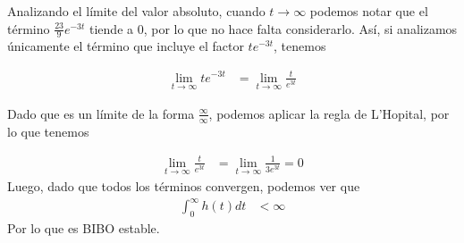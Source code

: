 \documentclass[
  11pt,
  letterpaper,
   addpoints,
  ]{exam}
\begin{document}
\begin{questions}
\begin{solution}
    
    Analizando el límite del valor absoluto, cuando \( t \to \infty \) podemos notar que el término \( \frac{23}{9}e^{-3t} \) tiende a 0, por lo que no hace falta considerarlo. Así, si analizamos únicamente el término que incluye el factor \( te^{-3t} \), tenemos

\begin{align}
\lim_{t \to \infty} te^{-3t} &= \lim_{t \to \infty} \frac{t}{e^{3t}} 
\end{align}

Dado que es un límite de la forma \( \frac{\infty}{\infty} \), podemos aplicar la regla de L'Hopital, por lo que tenemos

\begin{align}
\lim_{t \to \infty} \frac{t}{e^{3t}} &= \lim_{t \to \infty} \frac{1}{3e^{3t}} = 0 
\end{align}
Luego, dado que todos los términos convergen, podemos ver que
\begin{align}
\int_0^\infty h(t) dt &< \infty 
\end{align}
Por lo que es BIBO estable.

\end{solution}
\end{questions}
\end{document}

